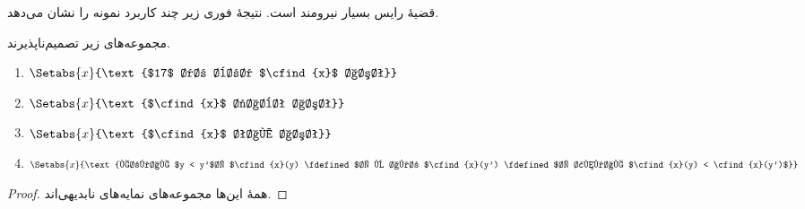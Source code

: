 \documentclass[../../../include/open-logic-section]{subfiles}
\begin{document}
قضیهٔ رایس بسیار نیرومند است. نتیجهٔ فوری زیر چند کاربرد نمونه را
نشان می‌دهد.
\begin{cor}
مجموعه‌های زیر تصمیم‌ناپذیرند.
\begin{enumerate}
\item $\Setabs{x}{\text{$17$ در برد $\cfind{x}$ است}}$
\item $\Setabs{x}{\text{$\cfind{x}$ ثابت است}}$
\item $\Setabs{x}{\text{$\cfind{x}$ تام است}}$
\item $\Setabs{x}{\text{هرگاه $y < y'$، $\cfind{x}(y) \fdefined$، و
    اگر $\cfind{x}(y') \fdefined$، آنگاه $\cfind{x}(y) < \cfind{x}(y')$}}$
\end{enumerate}
\end{cor}

\begin{proof}
  همهٔ این‌ها مجموعه‌های نمایه‌های نابدیهی‌اند.
\end{proof}
\end{document}
